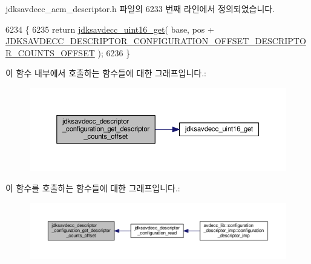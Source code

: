 jdksavdecc\+\_\+aem\+\_\+descriptor.\+h 파일의 6233 번째 라인에서 정의되었습니다.


\begin{DoxyCode}
6234 \{
6235     \textcolor{keywordflow}{return} \hyperlink{group__endian_ga3fbbbc20be954aa61e039872965b0dc9}{jdksavdecc\_uint16\_get}( base, pos + 
      \hyperlink{group__descriptor__configuration_ga2d50a3e2dcf45932f1d0706a0545c354}{JDKSAVDECC\_DESCRIPTOR\_CONFIGURATION\_OFFSET\_DESCRIPTOR\_COUNTS\_OFFSET}
       );
6236 \}
\end{DoxyCode}


이 함수 내부에서 호출하는 함수들에 대한 그래프입니다.\+:
\nopagebreak
\begin{figure}[H]
\begin{center}
\leavevmode
\includegraphics[width=350pt]{group__descriptor__configuration_gaa8e16a0d5ab45bd75106b222966faac7_cgraph}
\end{center}
\end{figure}




이 함수를 호출하는 함수들에 대한 그래프입니다.\+:
\nopagebreak
\begin{figure}[H]
\begin{center}
\leavevmode
\includegraphics[width=350pt]{group__descriptor__configuration_gaa8e16a0d5ab45bd75106b222966faac7_icgraph}
\end{center}
\end{figure}


